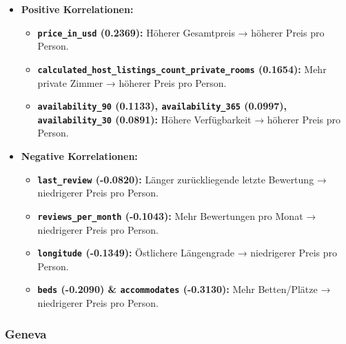 \documentclass[
  journal,
]{IEEEtran}%
\providecommand{\tightlist}{%
  \setlength{\itemsep}{0pt}\setlength{\parskip}{0pt}}\usepackage{longtable,booktabs,array}
\begin{document}
\begin{itemize}
\item
  \textbf{Positive Korrelationen:}

  \begin{itemize}
  \tightlist
  \item
    \textbf{\texttt{price\_in\_usd} (0.2369):} Höherer Gesamtpreis →
    höherer Preis pro Person.
  \item
    \textbf{\texttt{calculated\_host\_listings\_count\_private\_rooms}
    (0.1654):} Mehr private Zimmer → höherer Preis pro Person.
  \item
    \textbf{\texttt{availability\_90} (0.1133),
    \texttt{availability\_365} (0.0997), \texttt{availability\_30}
    (0.0891):} Höhere Verfügbarkeit → höherer Preis pro Person.
  \end{itemize}
\item
  \textbf{Negative Korrelationen:}

  \begin{itemize}
  \tightlist
  \item
    \textbf{\texttt{last\_review} (-0.0820):} Länger zurückliegende
    letzte Bewertung → niedrigerer Preis pro Person.
  \item
    \textbf{\texttt{reviews\_per\_month} (-0.1043):} Mehr Bewertungen
    pro Monat → niedrigerer Preis pro Person.
  \item
    \textbf{\texttt{longitude} (-0.1349):} Östlichere Längengrade →
    niedrigerer Preis pro Person.
  \item
    \textbf{\texttt{beds} (-0.2090) \& \texttt{accommodates} (-0.3130):}
    Mehr Betten/Plätze → niedrigerer Preis pro Person.
  \end{itemize}
\end{itemize}

\hypertarget{geneva}{%
\subsubsection{Geneva}\label{geneva}}
\end{document}
